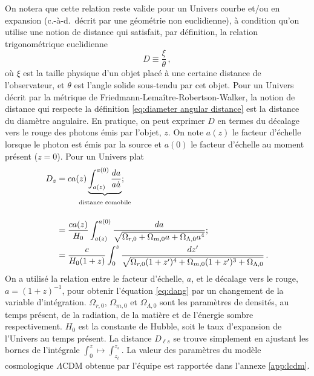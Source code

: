 On notera que cette relation reste valide pour un Univers courbe et/ou en expansion 
(c.-à-d.\ décrit par une géométrie non euclidienne), 
à condition qu'on utilise une notion de distance qui satisfait, par définition, la relation trigonométrique euclidienne
\begin{equation}\label{eq:diameter angular distance}
       D \equiv \frac{\xi}{\theta}\, ,
\end{equation} 
où $\xi$ est la taille physique d'un objet placé à une certaine distance de l'observateur, et $\theta$ est l'angle solide sous-tendu 
par cet objet. Pour un Univers décrit par la métrique de Friedmann-Lemaître-Robertson-Walker,
la notion de distance qui respecte la définition \eqref{eq:diameter angular distance} est la distance du diamètre angulaire. 
En pratique, on peut exprimer $D$ en termes du décalage vers le rouge des photons émis par l'objet, $z$. 
On note $a(z)$ le facteur d'échelle lorsque le photon est émis par la source et $a(0)$ le facteur d'échelle au moment présent ($z=0$).
Pour un Univers plat \citep[voir les manuels de référence][]{Coles2002,Dodelson2003,Bartelmann2004}
\begin{align}
        D_z &= c a(z) \underbrace{\int_{a(z)}^{a(0)} \frac{da}{a \dot{a}}}_{\strut\mathclap{\text{distance comobile}}}; \\[2ex]
                \nonumber
              &= \frac{c a(z)}{H_0} \int_{a(z)}^{a(0)} \frac{da}{\sqrt{\Omega_{r,0} + \Omega_{m,0} a  + \Omega_{\Lambda,0}a^{4}}}; \\
              \label{eq:dang}
              &= \frac{c}{H_0(1 + z)} \int_{0}^{z} \frac{dz'}{\sqrt{\Omega_{r,0}(1 + z')^{4} + \Omega_{m,0} (1 + z')^{3} + \Omega_{\Lambda,0} }}\, .
\end{align}
On a utilisé la relation entre le facteur d'échelle, $a$, et le décalage vers le rouge, $a = (1 + z)^{-1}$, pour obtenir l'équation \eqref{eq:dang} 
par un changement de la variable d'intégration. 
$\Omega_{r,0}$, $\Omega_{m,0}$ et $\Omega_{\Lambda, 0}$ sont les paramètres de densités, au temps présent, de la radiation, de la matière et de l'énergie sombre 
respectivement. 
$H_0$ est la constante de Hubble, soit le taux 
d'expansion de l'Univers au temps présent. La distance $D_{\ell s}$ se trouve simplement en ajustant les bornes de l'intégrale $\int_0^{z} \mapsto \int_{z_\ell}^{z_s}$.
La valeur des paramètres du modèle cosmologique $\Lambda$CDM obtenue par l'équipe \citet{PlanckCollaboration2018}
est rapportée dans l'annexe \ref{app:lcdm}.


